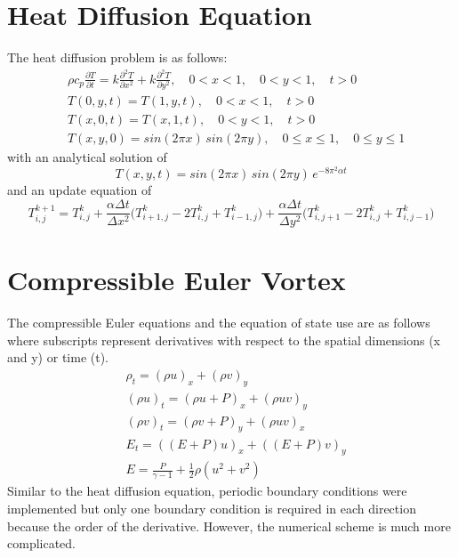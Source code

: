 \documentclass[review]{elsarticle}
\begin{document}
\section{Heat Diffusion Equation}
\label{Heat-Diffusion}
The heat diffusion problem is as follows:
\begin{align*}
    &\rho c_p \frac{\partial T}{\partial t} = k\frac{\partial^2 T}{\partial x^2}+k\frac{\partial^2 T}{\partial y^2},\quad 0<x<1,\quad 0<y<1,\quad t>0\\
    &T(0,y,t) = T(1,y,t),\quad 0<x<1,\quad t>0\\
    &T(x,0,t) = T(x,1,t),\quad 0<y<1,\quad t>0\\
    &T(x,y,0) = sin(2\pi x)\,sin(2\pi y), \quad 0\leq x\leq 1,\quad 0 \leq y \leq 1
\end{align*}
with an analytical solution of
\begin{equation*}
\label{heat-analyt}
    T(x,y,t) = sin(2\pi x)\,sin(2\pi y)\,e^{-8\pi^2\alpha t}
\end{equation*}
and an update equation of 
\begin{equation*}
    \label{heat-update}
    T_{i,j}^{k+1} = T_{i,j}^{k}+\frac{\alpha \Delta t}{\Delta x^2}\big(T_{i+1,j}^{k}-2T_{i,j}^{k}+T_{i-1,j}^{k}\big)+\frac{\alpha \Delta t}{\Delta y^2}\big(T_{i,j+1}^{k}-2T_{i,j}^{k}+T_{i,j-1}^{k}\big)
\end{equation*}

\section{Compressible Euler Vortex}
\label{Compressible-Euler}
The compressible Euler equations and the equation of state use are as follows where subscripts represent derivatives with respect to the spatial dimensions (x and y) or time (t).
\begin{align*}
    &\rho_t  = (\rho u)_x + (\rho v)_y \\ 
    &(\rho u)_t  = (\rho u+P)_x + (\rho u v)_y\\
    &(\rho v)_t  = (\rho v+P)_y + (\rho u v)_x\\
    &E_t = ((E+P)u)_x+((E+P)v)_y\\
    &E = \frac{P}{\gamma -1}+\frac{1}{2}\rho(u^2+v^2)
\end{align*}
Similar to the heat diffusion equation, periodic boundary conditions were implemented but only one boundary condition is required in each direction because the order of the derivative. However, the numerical scheme is much more complicated.
\end{document}
